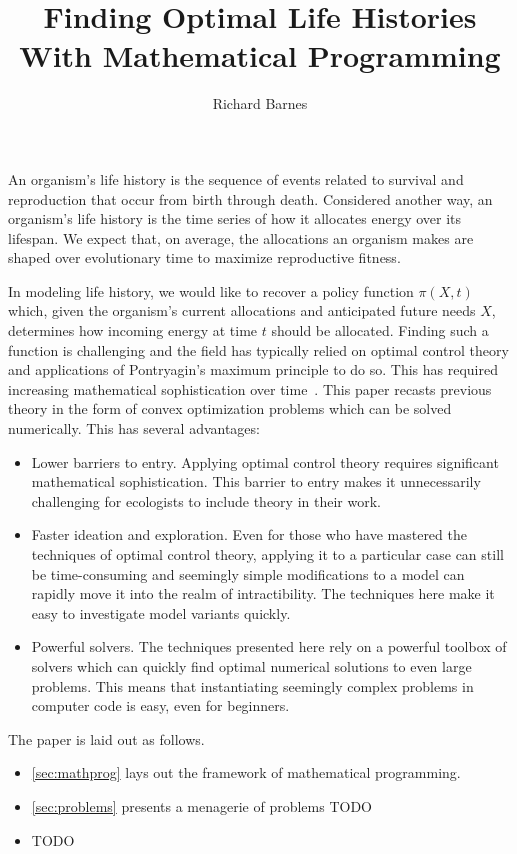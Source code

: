 \documentclass{article}
\title{Finding Optimal Life Histories With Mathematical Programming}
\author{Richard Barnes}
\date{}
\begin{document}
\maketitle

\tableofcontents

An organism's life history is the sequence of events related to survival and reproduction that occur from birth through death. Considered another way, an organism's life history is the time series of how it allocates energy over its lifespan. We expect that, on average, the allocations an organism makes are shaped over evolutionary time to maximize reproductive fitness.

In modeling life history, we would like to recover a policy function $\pi(X,t)$ which, given the organism's current allocations and anticipated future needs $X$, determines how incoming energy at time $t$ should be allocated. Finding such a function is challenging and the field has typically relied on optimal control theory and applications of Pontryagin's maximum principle to do so. This has required increasing mathematical sophistication over time~\citep{mirmirani_competition_1978, iwasa_optimal_1989, pugliese_optimal_1990, mironchenko_optimal_2014}. This paper recasts previous theory in the form of convex optimization problems which can be solved numerically. This has several advantages:
\begin{itemize}
\item Lower barriers to entry. Applying optimal control theory requires significant mathematical sophistication. This barrier to entry makes it unnecessarily challenging for ecologists to include theory in their work.
\item Faster ideation and exploration. Even for those who have mastered the techniques of optimal control theory, applying it to a particular case can still be time-consuming and seemingly simple modifications to a model can rapidly move it into the realm of intractibility. The techniques here make it easy to investigate model variants quickly.
\item Powerful solvers. The techniques presented here rely on a powerful toolbox of solvers which can quickly find optimal numerical solutions to even large problems. This means that instantiating seemingly complex problems in computer code is easy, even for beginners.
\end{itemize}

The paper is laid out as follows.
\begin{itemize}
\item \autoref{sec:mathprog} lays out the framework of mathematical programming.
\item \autoref{sec:problems} presents a menagerie of problems TODO
\item TODO
\end{itemize}
\end{document}
